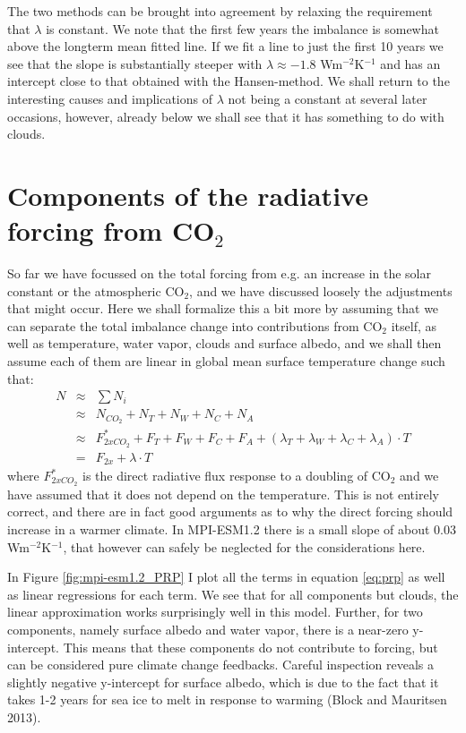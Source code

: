 \documentclass[12pt]{book}
\begin{document}
The two methods can be brought into agreement by relaxing the requirement that $\lambda$ is constant. We note that the first few years the imbalance is somewhat above the longterm mean fitted line. If we fit a line to just the first 10 years we see that the slope is substantially steeper with $\lambda \approx -1.8$ Wm$^{-2}$K$^{-1}$ and has an intercept close to that obtained with the Hansen-method. 
We shall return to the interesting causes and implications of $\lambda$ not being a constant at several later occasions, however, already below we shall see that it has something to do with clouds.

\section{Components of the radiative forcing from CO$_2$}
So far we have focussed on the total forcing from e.g. an increase in the solar constant or the atmospheric CO$_2$, and we have discussed loosely the adjustments that might occur. Here we shall formalize this a bit more by assuming that we  can separate the total imbalance change into contributions from CO$_2$ itself, as well as temperature, water vapor, clouds and surface albedo, and we shall then assume each of them are linear in global mean surface temperature change such that:
\begin{eqnarray}
N &\approx& \sum{ N_i}     \label{eq:prp} \\
 &\approx&  N_{CO_2} +  N_{T} +  N_{W}  +  N_{C}  +  N_{A} \nonumber  \\
  &\approx& F^*_{2xCO_2} + F_T  + F_W + F_C + F_A + \left(\lambda_T + \lambda_W + \lambda_C + \lambda_A \right)\cdot T \nonumber \\
  &=& F_{2x} + \lambda \cdot T \nonumber
\end{eqnarray}
where $F^*_{2xCO_2}$ is the direct radiative flux response to a doubling of CO$_2$ and we have assumed that it does not depend on the temperature. This is not entirely correct, and there are in fact good arguments as to why the direct forcing should increase in a warmer climate. In MPI-ESM1.2 there is a small slope of about 0.03 Wm$^{-2}$K$^{-1}$, that however can safely be neglected for the considerations here.

In Figure \ref{fig:mpi-esm1.2_PRP} I plot all the terms in equation \ref{eq:prp} as well as linear regressions for each term. We see that for all components but clouds, the linear approximation works surprisingly well in this model. Further, for two components, namely surface albedo and water vapor, there is a near-zero y-intercept. This means that these components do not contribute to forcing, but can be considered pure climate change feedbacks. Careful inspection reveals a slightly negative y-intercept for surface albedo, which is due to the fact that it takes 1-2 years for sea ice to melt in response to warming (Block and Mauritsen 2013). 
\end{document}
